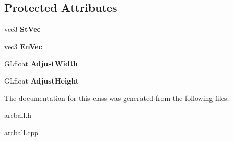\subsection*{Protected Attributes}
\begin{DoxyCompactItemize}
\item 
\hypertarget{classArcBall__t_a1ea7817b9e59153dd13d8c776ad1ec82}{vec3 {\bfseries St\-Vec}}\label{classArcBall__t_a1ea7817b9e59153dd13d8c776ad1ec82}

\item 
\hypertarget{classArcBall__t_abbbe14879d015fa4d2bf396b25ba5f2a}{vec3 {\bfseries En\-Vec}}\label{classArcBall__t_abbbe14879d015fa4d2bf396b25ba5f2a}

\item 
\hypertarget{classArcBall__t_a138f84b43a9fe26efb46734c93b782a0}{G\-Lfloat {\bfseries Adjust\-Width}}\label{classArcBall__t_a138f84b43a9fe26efb46734c93b782a0}

\item 
\hypertarget{classArcBall__t_ae5f8b2ea648b41ee1952dcdcd3857059}{G\-Lfloat {\bfseries Adjust\-Height}}\label{classArcBall__t_ae5f8b2ea648b41ee1952dcdcd3857059}

\end{DoxyCompactItemize}


The documentation for this class was generated from the following files\-:\begin{DoxyCompactItemize}
\item 
arcball.\-h\item 
arcball.\-cpp\end{DoxyCompactItemize}
